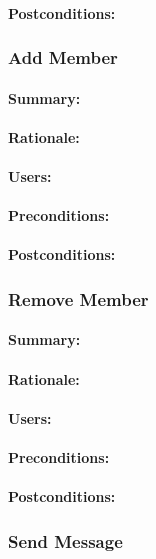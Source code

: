 \documentclass[11pt]{article}
\begin{document}
\paragraph{{Postconditions:}}
\subsubsection{Add Member} \label{UC-add-member}
\paragraph{Summary:}
\paragraph{Rationale:}
\paragraph{Users:}
\paragraph{Preconditions:}
\paragraph{{Postconditions:}}
\subsubsection{Remove Member} \label{UC-remove-member}
\paragraph{Summary:}
\paragraph{Rationale:}
\paragraph{Users:}
\paragraph{Preconditions:}
\paragraph{{Postconditions:}}
\subsubsection{Send Message} \label{UC-send-message}
\end{document}
